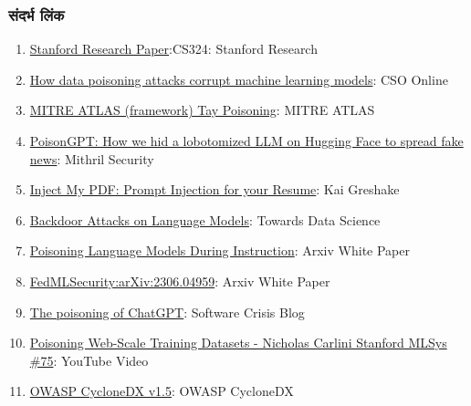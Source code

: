 \documentclass[
]{article}
\providecommand{\tightlist}{%
  \setlength{\itemsep}{0pt}\setlength{\parskip}{0pt}}
\begin{document}
\subsubsection{संदर्भ लिंक}\label{ux938ux926ux930ux92d-ux932ux915}

\begin{enumerate}
\def\labelenumi{\arabic{enumi}.}
\tightlist
\item
  \href{https://stanford-cs324.github.io/winter2022/lectures/data/}{Stanford
  Research Paper}:CS324: Stanford Research
\item
  \href{https://www.csoonline.com/article/3613932/how-data-poisoning-attacks-corrupt-machine-learning-models.html}{How
  data poisoning attacks corrupt machine learning models}: CSO Online
\item
  \href{https://atlas.mitre.org/studies/AML.CS0009/}{MITRE ATLAS
  (framework) Tay Poisoning}: MITRE ATLAS
\item
  \href{https://blog.mithrilsecurity.io/poisongpt-how-we-hid-a-lobotomized-llm-on-hugging-face-to-spread-fake-news/}{PoisonGPT:
  How we hid a lobotomized LLM on Hugging Face to spread fake news}:
  Mithril Security
\item
  \href{https://kai-greshake.de/posts/inject-my-pdf/}{Inject My PDF:
  Prompt Injection for your Resume}: Kai Greshake
\item
  \href{https://towardsdatascience.com/backdoor-attacks-on-language-models-can-we-trust-our-models-weights-73108f9dcb1f}{Backdoor
  Attacks on Language Models}: Towards Data Science
\item
  \href{https://arxiv.org/abs/2305.00944}{Poisoning Language Models
  During Instruction}: Arxiv White Paper
\item
  \href{https://arxiv.org/abs/2306.04959}{FedMLSecurity:arXiv:2306.04959}:
  Arxiv White Paper
\item
  \href{https://softwarecrisis.dev/letters/the-poisoning-of-chatgpt/}{The
  poisoning of ChatGPT}: Software Crisis Blog
\item
  \href{https://www.youtube.com/watch?v=h9jf1ikcGyk}{Poisoning Web-Scale
  Training Datasets - Nicholas Carlini \textbar{} Stanford MLSys \#75}:
  YouTube Video
\item
  \href{https://cyclonedx.org/capabilities/mlbom/}{OWASP CycloneDX
  v1.5}: OWASP CycloneDX
\end{enumerate}
\end{document}
